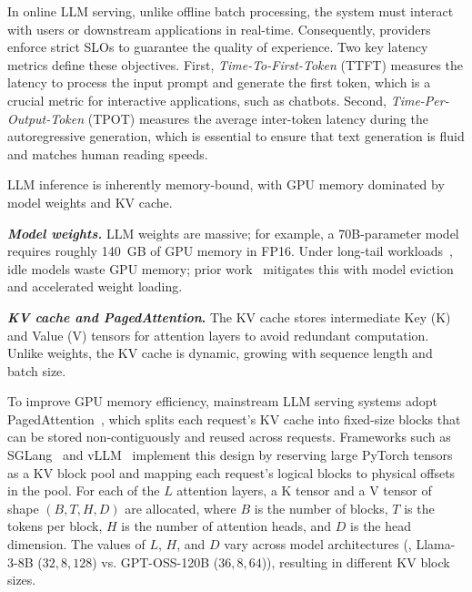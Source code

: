 \label{sec:background}

In online LLM serving, unlike offline batch processing, the system must interact with users or downstream applications in real-time. 
Consequently, providers enforce strict SLOs to guarantee the quality of experience. 
Two key latency metrics define these objectives. 
First, \textit{Time-To-First-Token} (TTFT) measures the latency to process the input prompt and generate the first token, which is a crucial metric for interactive applications, such as chatbots. 
Second, \textit{Time-Per-Output-Token} (TPOT) measures the average inter-token latency during the autoregressive generation, which is essential to ensure that text generation is fluid and matches human reading speeds.

LLM inference is inherently memory-bound, with GPU memory dominated by model weights and KV cache.

\noindent \textbf{\textit{Model weights.}}
LLM weights are massive; for example, a 70B-parameter model requires roughly 140~GB of GPU memory in FP16. 
Under long-tail workloads~\cite{aegaeon}, idle models waste GPU memory; prior work~\cite{aegaeon,fu2024serverlessllm} mitigates this with model eviction and accelerated weight loading.

\noindent \textbf{\textit{KV cache and PagedAttention}.}
The KV cache stores intermediate Key (K) and Value (V) tensors for attention layers to avoid redundant computation. 
Unlike weights, the KV cache is dynamic, growing with sequence length and batch size. 

To improve GPU memory efficiency, mainstream LLM serving systems adopt PagedAttention~\cite{kwon2023efficient}, which splits each request’s KV cache into fixed-size blocks that can be stored non-contiguously and reused across requests.
Frameworks such as SGLang~\cite{sglang@arxiv23} and vLLM~\cite{kwon2023efficient} implement this design by reserving large PyTorch tensors as a KV block pool and mapping each request’s logical blocks to physical offsets in the pool. For each of the $L$ attention layers, a K tensor and a V tensor of shape $(B, T, H, D)$ are allocated, where $B$ is the number of blocks, $T$ is the tokens per block, $H$ is the number of attention heads, and $D$ is the head dimension. The values of $L$, $H$, and $D$ vary across model architectures (\eg, Llama-3-8B ($32, 8, 128$) vs. GPT-OSS-120B ($36, 8, 64$)), resulting in different KV block sizes.

